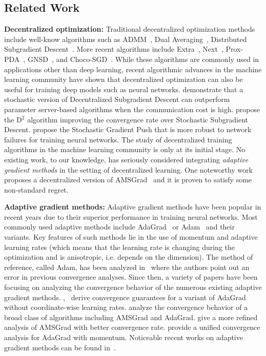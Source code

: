 \documentclass[11pt]{article}
\begin{document}
\subsection{Related Work}


\textbf{Decentralized optimization:} 
Traditional decentralized optimization methods include well-know algorithms such as ADMM~\citep{boyd2011distributed}, Dual Averaging~\citep{duchi2011dual}, Distributed Subgradient Descent~\citep{nedic2009distributed}. 
More recent algorithms include Extra~\citep{shi2015extra}, Next~\citep{di2016next}, Prox-PDA~\citep{hong2017prox}, GNSD~\citep{lu2019gnsd}, and Choco-SGD~\citep{koloskova2019decentralized}.  
While these algorithms are commonly used in applications other than deep learning, recent algorithmic advances in the machine learning community have shown that decentralized optimization can also be useful for training deep models such as neural networks. 
\citet{lian2017can} demonstrate that a stochastic version of Decentralized Subgradient Descent can outperform parameter server-based algorithms when the communication cost is high. 
\citet{tang2018d} propose the D$^2$ algorithm improving the convergence rate over Stochastic Subgradient Descent.
\citet{assran2019stochastic} propose the Stochastic Gradient Push that is more robust to network failures for training neural networks. 
The study of decentralized training algorithms in the machine learning community is only at its initial stage. 
No existing work, to our knowledge, has seriously considered integrating \emph{adaptive gradient methods} in the setting of decentralized learning.
One noteworthy work~\citep{nazari2019dadam} proposes a decentralized version of AMSGrad~\citep{reddi2019convergence} and it is proven to satisfy some non-standard regret.


\textbf{Adaptive gradient methods:}  
Adaptive gradient methods have been popular in recent years due to their superior performance in training neural networks. 
Most commonly used adaptive methods include AdaGrad~\citep{duchi2011adaptive} or Adam~\citep{kingma2014adam} and their variants.  
Key features of such methods lie in the use of momentum and adaptive learning rates (which means that the learning rate is changing during the optimization and is anisotropic, i.e. depends on the dimension).
The method of reference, called Adam, has been analyzed in~\cite{reddi2019convergence} where the authors point out an error in previous convergence analyses. 
Since then, a variety of papers have been focusing on analyzing the convergence behavior of the numerous existing adaptive gradient methods. 
\citet{ward2019adagrad},~\citet{li2019convergence} derive convergence guarantees for a variant of AdaGrad without coordinate-wise learning rates. 
\citet{chen2018convergence} analyze the convergence behavior of a broad class of algorithms including AMSGrad and AdaGrad. \citet{zhou2018convergence} give a more refined analysis of AMSGrad with better convergence rate.
\citet{zou2018convergence} provide a unified convergence analysis for AdaGrad with momentum.
Noticeable recent works on adaptive gradient methods can be found in~\cite{agarwal2019efficient,luo2019adaptive,zaheer2018adaptive}.  
\end{document}
